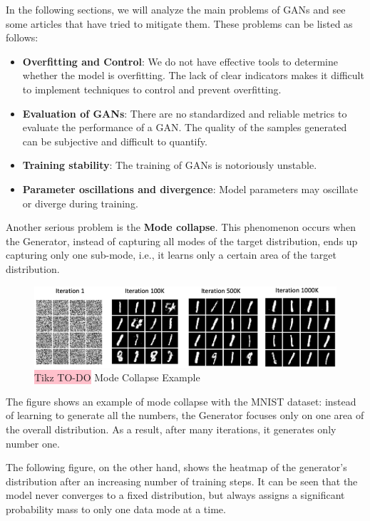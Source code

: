 In the following sections, we will analyze the main problems of GANs and see some articles that have tried to mitigate them. These problems can be listed as follows:
\begin{itemize}
    \item \textbf{Overfitting and Control}: We do not have effective tools to determine whether the model is overfitting. The lack of clear indicators makes it difficult to implement techniques to control and prevent overfitting.
    \item \textbf{Evaluation of GANs}: There are no standardized and reliable metrics to evaluate the performance of a GAN. The quality of the samples generated can be subjective and difficult to quantify.
    \item \textbf{Training stability}: The training of GANs is notoriously unstable. 
    \item \textbf{Parameter oscillations and divergence}: Model parameters may oscillate or diverge during training. 
\end{itemize}

Another serious problem is the \textbf{Mode collapse}. This phenomenon occurs when the Generator, instead of capturing all modes of the target distribution, ends up capturing only one sub-mode, i.e., it learns only a certain area of the target distribution.

\begin{figure}[!htbp]
    \centering
    \includegraphics[width=0.8\linewidth]{tikz/chapter9 - Mode Collapse MNIST.png}
    \caption{{\color{red}\colorbox{pink}{Tikz TO-DO}} Mode Collapse Example}
\end{figure}

The figure shows an example of mode collapse with the MNIST dataset: instead of learning to generate all the numbers, the Generator focuses only on one area of the overall distribution. As a result, after many iterations, it generates only number one.

The following figure, on the other hand, shows the heatmap of the generator's distribution after an increasing number of training steps. It can be seen that the model never converges to a fixed distribution, but always assigns a significant probability mass to only one data mode at a time.

